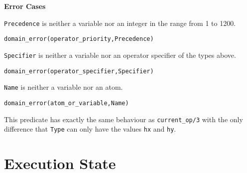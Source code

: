 \begin{description}
{\bf Error Cases}
\bi
\item 	{\tt Precedence} is neither a variable nor an integer in the
range from 1 to 1200. 
\bi
\item 	{\tt domain\_error(operator\_priority,Precedence)}
\ei
\item 	{\tt Specifier} is neither a variable nor an operator
specifier of the types above.
\bi
\item 	{\tt domain\_error(operator\_specifier,Specifier)}
\ei
\item 	{\tt Name} is neither a variable nor an atom.
\bi
\item 	{\tt domain\_error(atom\_or\_variable,Name)}
\ei
\ei



    This predicate has exactly the same behaviour as {\tt current\_op/3}
    with the only difference that {\tt Type} can only have the values
    {\tt hx} and {\tt hy}.
\end{description}




\section{Execution State}\label{environmental}

